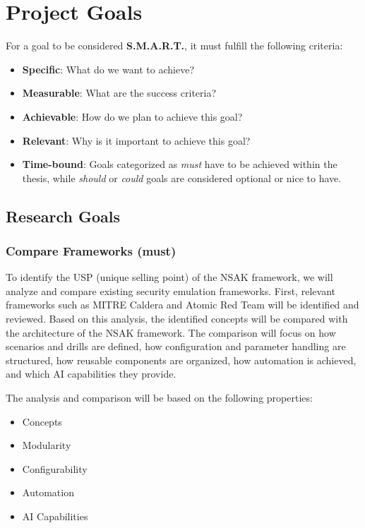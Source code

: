 
\chapter{Project Goals}\label{ch:project-goals}

For a goal to be considered \textbf{S.M.A.R.T.}, it must fulfill the following criteria:

\begin{itemize}
	\item \textbf{Specific}: What do we want to achieve?
	\item \textbf{Measurable}: What are the success criteria?
	\item \textbf{Achievable}: How do we plan to achieve this goal?
	\item \textbf{Relevant}: Why is it important to achieve this goal?
	\item \textbf{Time-bound}: Goals categorized as \textit{must} have to be achieved within the thesis, while \textit{should} or \textit{could} goals are considered optional or nice to have.
\end{itemize}

\section{Research Goals}\label{sec:research-goals}

\subsection{Compare Frameworks (must)}\label{subsec:compare-frameworks}

To identify the USP (unique selling point) of the \gls{NSAK} framework, we will analyze and compare existing security emulation frameworks.
First, relevant frameworks such as MITRE Caldera and Atomic Red Team will be identified and reviewed.
Based on this analysis, the identified concepts will be compared with the architecture of the \gls{NSAK} framework.
The comparison will focus on how scenarios and drills are defined, how configuration and parameter handling are structured, how reusable components are organized, how automation is achieved, and which \gls{AI} capabilities they provide.

The analysis and comparison will be based on the following properties:

\begin{itemize}
	\item Concepts
	\item Modularity
	\item Configurability
	\item Automation
	\item \gls{AI} Capabilities
\end{itemize}

